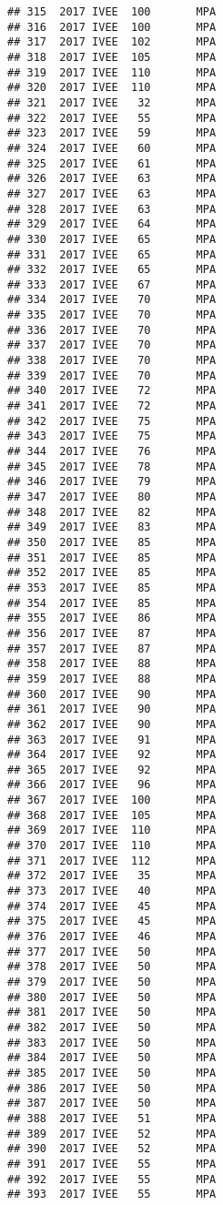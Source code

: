 \documentclass[]{article}
\begin{document}
\begin{verbatim}
## 315  2017 IVEE  100       MPA
## 316  2017 IVEE  100       MPA
## 317  2017 IVEE  102       MPA
## 318  2017 IVEE  105       MPA
## 319  2017 IVEE  110       MPA
## 320  2017 IVEE  110       MPA
## 321  2017 IVEE   32       MPA
## 322  2017 IVEE   55       MPA
## 323  2017 IVEE   59       MPA
## 324  2017 IVEE   60       MPA
## 325  2017 IVEE   61       MPA
## 326  2017 IVEE   63       MPA
## 327  2017 IVEE   63       MPA
## 328  2017 IVEE   63       MPA
## 329  2017 IVEE   64       MPA
## 330  2017 IVEE   65       MPA
## 331  2017 IVEE   65       MPA
## 332  2017 IVEE   65       MPA
## 333  2017 IVEE   67       MPA
## 334  2017 IVEE   70       MPA
## 335  2017 IVEE   70       MPA
## 336  2017 IVEE   70       MPA
## 337  2017 IVEE   70       MPA
## 338  2017 IVEE   70       MPA
## 339  2017 IVEE   70       MPA
## 340  2017 IVEE   72       MPA
## 341  2017 IVEE   72       MPA
## 342  2017 IVEE   75       MPA
## 343  2017 IVEE   75       MPA
## 344  2017 IVEE   76       MPA
## 345  2017 IVEE   78       MPA
## 346  2017 IVEE   79       MPA
## 347  2017 IVEE   80       MPA
## 348  2017 IVEE   82       MPA
## 349  2017 IVEE   83       MPA
## 350  2017 IVEE   85       MPA
## 351  2017 IVEE   85       MPA
## 352  2017 IVEE   85       MPA
## 353  2017 IVEE   85       MPA
## 354  2017 IVEE   85       MPA
## 355  2017 IVEE   86       MPA
## 356  2017 IVEE   87       MPA
## 357  2017 IVEE   87       MPA
## 358  2017 IVEE   88       MPA
## 359  2017 IVEE   88       MPA
## 360  2017 IVEE   90       MPA
## 361  2017 IVEE   90       MPA
## 362  2017 IVEE   90       MPA
## 363  2017 IVEE   91       MPA
## 364  2017 IVEE   92       MPA
## 365  2017 IVEE   92       MPA
## 366  2017 IVEE   96       MPA
## 367  2017 IVEE  100       MPA
## 368  2017 IVEE  105       MPA
## 369  2017 IVEE  110       MPA
## 370  2017 IVEE  110       MPA
## 371  2017 IVEE  112       MPA
## 372  2017 IVEE   35       MPA
## 373  2017 IVEE   40       MPA
## 374  2017 IVEE   45       MPA
## 375  2017 IVEE   45       MPA
## 376  2017 IVEE   46       MPA
## 377  2017 IVEE   50       MPA
## 378  2017 IVEE   50       MPA
## 379  2017 IVEE   50       MPA
## 380  2017 IVEE   50       MPA
## 381  2017 IVEE   50       MPA
## 382  2017 IVEE   50       MPA
## 383  2017 IVEE   50       MPA
## 384  2017 IVEE   50       MPA
## 385  2017 IVEE   50       MPA
## 386  2017 IVEE   50       MPA
## 387  2017 IVEE   50       MPA
## 388  2017 IVEE   51       MPA
## 389  2017 IVEE   52       MPA
## 390  2017 IVEE   52       MPA
## 391  2017 IVEE   55       MPA
## 392  2017 IVEE   55       MPA
## 393  2017 IVEE   55       MPA

\end{verbatim}
\end{document}
